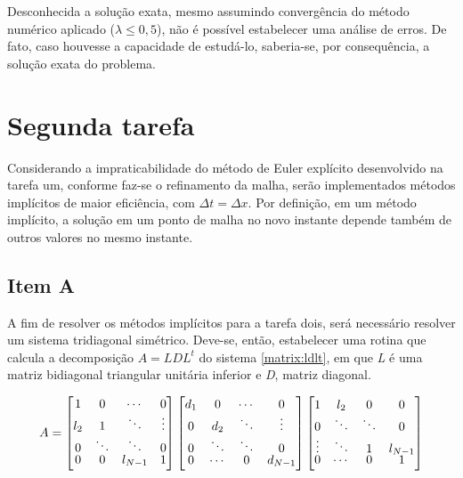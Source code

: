 \documentclass[12pt]{article}
\begin{document}
\begin{spacing}{1.5}
Desconhecida a solução exata, mesmo assumindo convergência do método numérico aplicado ($\lambda \leq 0,5$), não é possível estabelecer uma análise de erros. De fato, caso houvesse a capacidade de estudá-lo, saberia-se, por consequência, a solução exata do problema.

\clearpage
\section{Segunda tarefa}

Considerando a impraticabilidade do método de Euler explícito desenvolvido na tarefa um, conforme faz-se o refinamento da malha, serão implementados métodos implícitos de maior eficiência, com $\Delta t = \Delta x$. Por definição, em um método implícito, a solução em um ponto de malha no novo instante depende também de outros valores no mesmo instante. 

\subsection{Item A}

A fim de resolver os métodos implícitos para a tarefa dois, será necessário resolver um sistema tridiagonal simétrico. Deve-se, então, estabelecer uma rotina que calcula a decomposição $A=LDL^{t}$ do sistema \eqref{matrix:ldlt}, em que \textit{L} é uma matriz bidiagonal triangular unitária inferior e \textit{D}, matriz diagonal.


\begin{gather}\label{matrix:ldlt}
    A =
    \renewcommand*{\arraystretch}{0.75}
    \begin{bmatrix}
    1 & 0 & \cdots & 0\\
    l_2 & 1 & \ddots & \vdots\\
    0 & \ddots & \ddots & 0 \\
    0 & 0 & l_{N-1} & 1
    \end{bmatrix}
    \begin{bmatrix}
    d_1 & 0 & \cdots & 0\\
    0 & d_2 & \ddots & \vdots\\
    0 & \ddots & \ddots & 0 \\
    0 & \cdots & 0 & d_{N-1}
    \end{bmatrix}
    \begin{bmatrix}
    1 & l_2 & 0 & 0\\
    0 & \ddots & \ddots & 0\\
    \vdots & \ddots & 1 & l_{N-1} \\
    0 & \cdots & 0 & 1
    \end{bmatrix}
\end{gather}


\end{spacing}
\end{document}
